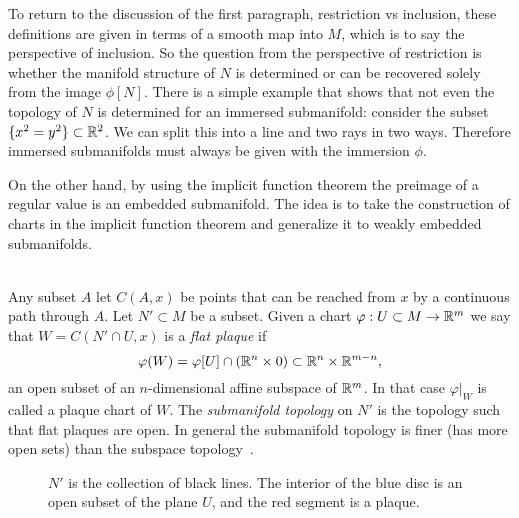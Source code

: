 To return to the discussion of the first paragraph, restriction vs inclusion, these definitions are given in terms of a smooth map into $M$, which is to say the perspective of inclusion.
So the question from the perspective of restriction is whether the manifold structure of $N$ is determined or can be recovered solely from the image $\phi[N]$.
There is a simple example that shows that not even the topology of $N$ is determined for an immersed submanifold: consider the subset $\{x^2 = y^2\} \subset \mathbb{R}^2$.
We can split this into a line and two rays in two ways.
Therefore immersed submanifolds must always be given with the immersion $\phi$.

On the other hand, by using the implicit function theorem the preimage of a regular value is an embedded submanifold.
The idea is to take the construction of charts in the implicit function theorem and generalize it to weakly embedded submanifolds.

\begin{definition}
\label{def:plaques}
\textup{\cite[Def~1.2.1,1.2.2,Thm~1.2.7]{Sharpe1997}} \\
Any subset $A$ let $C(A,x)$ be points that can be reached from $x$ by a continuous path through $A$.
Let $N' \subset M$ be a subset.
Given a chart $\varphi: U \subset M \to \mathbb{R}^m$ we say that $W = C(N'\cap U,x)$ is a \emph{flat plaque} if 
\[
\varphi(W) = \varphi[U] \cap (\mathbb{R}^n \times 0) \subset \mathbb{R}^n \times \mathbb{R}^{m-n},
\]
an open subset of an $n$-dimensional affine subspace of $\mathbb{R}^m$.
In that case $\varphi|_W$ is called a plaque chart of $W$.
The \emph{submanifold topology} on $N'$ is the topology such that flat plaques are open.
In general the submanifold topology is finer (has more open sets) than the subspace topology~\cite[Def~1.2.4]{Sharpe1997}.
\end{definition}

\begin{figure}[h]
\begin{center}
\caption{$N'$ is the collection of black lines. The interior of the blue disc is an open subset of the plane $U$, and the red segment is a plaque.}
\end{center}
\end{figure}


